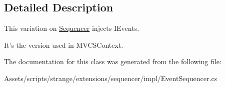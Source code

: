 \subsection{Detailed Description}
This variation on \hyperlink{classstrange_1_1extensions_1_1sequencer_1_1impl_1_1_sequencer}{Sequencer} injects I\-Events. 

It's the version used in M\-V\-C\-S\-Context. 

The documentation for this class was generated from the following file\-:\begin{DoxyCompactItemize}
\item 
Assets/scripts/strange/extensions/sequencer/impl/Event\-Sequencer.\-cs\end{DoxyCompactItemize}
